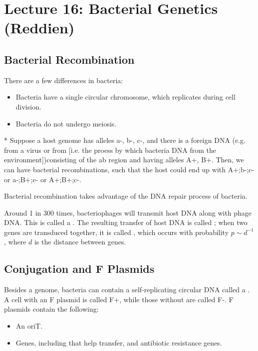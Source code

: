 \section*{Lecture 16: Bacterial Genetics (Reddien)}
\setcounter{section}{16}

\subsection{Bacterial Recombination}

\begin{fact}
	There are a few differences in bacteria:
	\begin{itemize}
		\item Bacteria have a single circular chromosome, which replicates during cell division.
		\item Bacteria do not undergo meiosis.
	\end{itemize}
\end{fact}

\begin{exm}*
	Suppose a host genome has alleles a-, b-, c-, and there is a foreign DNA (e.g. from a virus or from  [i.e. the proess by which bacteria  DNA from the environment])consisting of the ab region and having alleles A+, B+.
	Then, we can have bacterial recombinations, such that the host could end up with A+;b-;c- or a-;B+;c- or A+;B+;c-.
\end{exm}

\begin{fact}
	Bacterial recombination takes advantage of the DNA repair process of bacteria.
\end{fact}

\begin{fact}
	Around 1 in 300 times, bacteriophages will transmit host DNA along with phage DNA. This is called a .
	The resulting transfer of host DNA is called ; when two genes are transduced together, it is called , which occurs with probability $p \sim d^{-1}$, where $d$ is the distance between genes.
\end{fact}

\subsection{Conjugation and F Plasmids}

\begin{fact}
	Besides a genome, bacteria can contain a self-replicating circular DNA called a . 
	A cell with an F plasmid is called F+, while those without are called F-. F plasmids contain the following:
	\begin{itemize}
		\item An  oriT.
		\item Genes, including  that help transfer, and antibiotic resistance genes.
	\end{itemize}
\end{fact}

